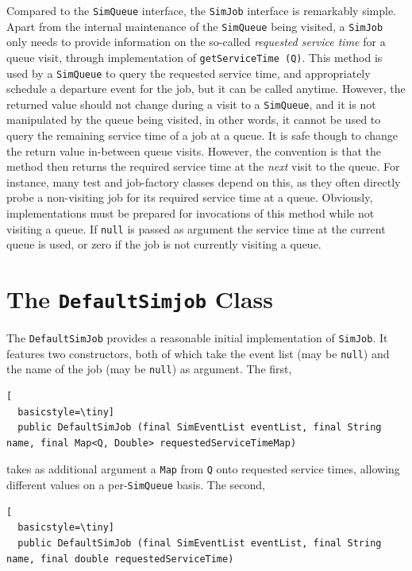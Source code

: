 Compared to the \lstinline|SimQueue| interface,
  the \lstinline|SimJob| interface is remarkably simple.
Apart from the internal maintenance of the \lstinline-SimQueue-
  being visited,
  a \lstinline-SimJob- only needs to provide information on the
  so-called {\em requested service time\/} for a queue visit,
  through implementation of
  \lstinline-getServiceTime (Q)-.
This method is used
  by a \lstinline|SimQueue|
  to query the requested service time,
  and appropriately schedule a departure event for the job,
  but it can be called anytime.
However,
  the returned value
  should not change during a visit to a \lstinline-SimQueue-,
  and it is not manipulated by the queue being visited,
  in other words,
  it cannot be used
  to query the remaining service time
  of a job at a queue.
It is safe though
  to change the return value in-between queue visits.
However, the convention is
  that the method then returns
  the required service time
  at the {\em next} visit to the queue.
For instance,
  many test and job-factory classes depend on this,
  as they often directly probe
  a non-visiting job
  for its required service time at a queue.
Obviously, implementations
  must be prepared
  for invocations
  of this method while not visiting a queue.
If \lstinline|null| is passed as argument
  the service time at the current queue is used,
  or zero if the job is not currently visiting a queue.

\section{The \texttt{DefaultSimjob} Class}

The \lstinline|DefaultSimJob| provides a reasonable
  initial implementation of \lstinline|SimJob|.
It features two constructors,
  both of which take the event list (may be \lstinline|null|)
  and the name of the job (may be \lstinline|null|)
  as argument.
The first,

\begin{lstlisting}[
  basicstyle=\tiny]
  public DefaultSimJob (final SimEventList eventList, final String name, final Map<Q, Double> requestedServiceTimeMap)
\end{lstlisting}

\noindent takes as additional argument
  a \lstinline|Map|
  from \lstinline|Q| onto requested
  service times,
  allowing different values
  on a per-\lstinline|SimQueue| basis.
The second,

\begin{lstlisting}[
  basicstyle=\tiny]
  public DefaultSimJob (final SimEventList eventList, final String name, final double requestedServiceTime)
\end{lstlisting}

